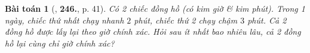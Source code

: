 \documentclass{article}
\numberwithin{equation}{section}
\newtheorem{baitoan}{Bài toán}[section]
\begin{document}
\begin{baitoan}[\cite{Binh_Toan_6_tap_1}, \textbf{246.}, p. 41]
	Có 2 chiếc đồng hồ (có kim giờ \& kim phút). Trong 1 ngày, chiếc thứ nhất chạy nhanh $2$ phút, chiếc thứ 2 chạy chậm $3$ phút. Cả 2 đồng hồ được lấy lại theo giờ chính xác. Hỏi sau ít nhất bao nhiêu lâu, cả 2 đồng hồ lại cùng chỉ giờ chính xác?
\end{baitoan}


\printbibliography[heading=bibintoc]
	
\end{document}
